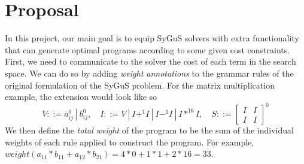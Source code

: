 \section{Proposal}
\label{sec:proposal}
%
In this project, our main goal is to equip SyGuS solvers with extra functionality that can generate optimal programs according to some given cost constraints.
%
First, we need to communicate to the solver the cost of each term in the search space.
%
We can do so by adding \emph{weight annotations} to the grammar rules of the original formulation of the SyGuS problem.
%
For the matrix multiplication example, the extension would look like so
%
\[
V ::= a_{ij}^0 \ | \ b_{ij}^0, \quad
I ::= V \ | \ I +^1 I \ | \ I -^1 I \ | \ I *^{16} I, \quad
S ::=
\begin{bmatrix} I & I \\
I & I
\end{bmatrix}^0
\]
%
We then define the \emph{total weight} of the program to be the sum of the individual weights of each rule applied to construct the program. For example, $weight(a_{11} * b_{11} + a_{12} * b_{21}) = 4*0 + 1*1 + 2* 16 = 33$.
%

